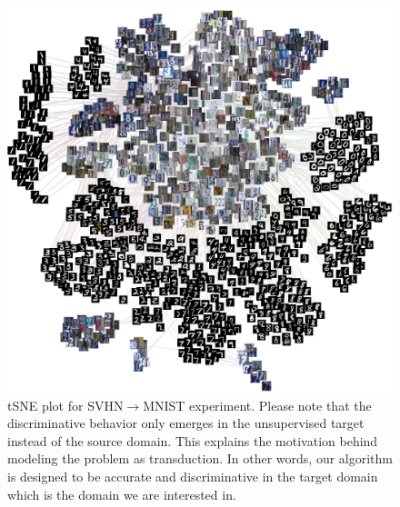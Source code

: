 \begin{figure}[ht]
        \includegraphics[width=\textwidth]{out_im.png}
        \vspace{-5mm}
\caption{tSNE plot for SVHN$\rightarrow$MNIST experiment. Please note that the discriminative behavior only emerges in the unsupervised target instead of the source domain. This explains the motivation behind modeling the problem as transduction. In other words, our algorithm is designed to be accurate and discriminative in the target domain which is the domain we are interested in.  }
\label{fig:tsnedigit}
\end{figure}
